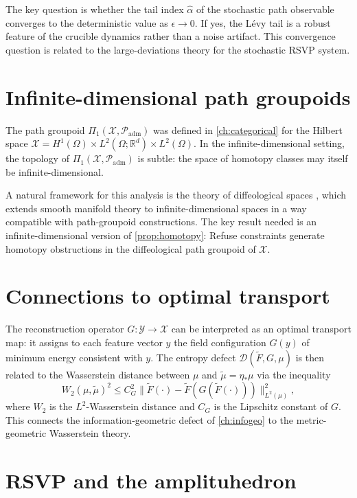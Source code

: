 \documentclass[12pt, oneside]{memoir}
\newcommand{\X}{\mathcal{X}}
\newcommand{\Ft}{\widetilde{F}}
\newcommand{\Padm}{\mathcal{P}_{\mathrm{adm}}}
\newcommand{\nnorm}[1]{\lVert #1 \rVert}
\begin{document}
The key question is whether the tail index $\hat\alpha$ of the stochastic path observable
converges to the deterministic value as $\epsilon \to 0$.  If yes, the Lévy tail is a
robust feature of the crucible dynamics rather than a noise artifact.  This convergence
question is related to the large-deviations theory for the stochastic RSVP system.

\section{Infinite-dimensional path groupoids}

The path groupoid $\Pi_1(\X, \Padm)$ was defined in \cref{ch:categorical} for the
Hilbert space $\X = H^1(\Omega) \times L^2(\Omega;\mathbb{R}^d) \times L^2(\Omega)$.
In the infinite-dimensional setting, the topology of $\Pi_1(\X, \Padm)$ is subtle: the
space of homotopy classes may itself be infinite-dimensional.

A natural framework for this analysis is the theory of diffeological spaces
\cite{iglesias2013}, which extends smooth manifold theory to infinite-dimensional spaces
in a way compatible with path-groupoid constructions.  The key result needed is an
infinite-dimensional version of \cref{prop:homotopy}: Refuse constraints generate
homotopy obstructions in the diffeological path groupoid of $\X$.

\section{Connections to optimal transport}

The reconstruction operator $G: \mathcal{Y} \to \X$ can be interpreted as an optimal
transport map: it assigns to each feature vector $y$ the field configuration $G(y)$ of
minimum energy consistent with $y$.  The entropy defect $\mathcal{D}(\Ft, G, \mu)$ is
then related to the Wasserstein distance between $\mu$ and $\tilde\mu = \eta_*\mu$ via
the inequality
\begin{equation}
  W_2(\mu, \tilde\mu)^2 \le C_G^2 \nnorm{\Ft(\cdot) - \Ft(G(\Ft(\cdot)))}_{L^2(\mu)}^2,
\end{equation}
where $W_2$ is the $L^2$-Wasserstein distance and $C_G$ is the Lipschitz constant of
$G$.  This connects the information-geometric defect of \cref{ch:infogeo} to the
metric-geometric Wasserstein theory.

\section{RSVP and the amplituhedron}
\end{document}
